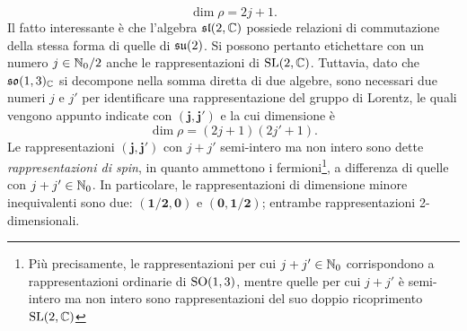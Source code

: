 \begin{equation}
    \dim{\rho} = 2j + 1.
\end{equation}
Il fatto interessante è che l'algebra $\mathfrak{sl}(2,\mathbb{C})$ possiede relazioni di commutazione della stessa forma di quelle di $\mathfrak{su}(2)$. Si possono pertanto etichettare con un numero $j \in \mathbb{N}_0/2$ anche le rappresentazioni di $\mathrm{SL}(2,\mathbb{C})$. Tuttavia, dato che $\mathfrak{so}(1,3)_{\mathbb{C}}$ si decompone nella somma diretta di due algebre, sono necessari due numeri $j$ e $j'$ per identificare una rappresentazione del gruppo di Lorentz, le quali vengono appunto indicate con $\bm{(j,j')}$ e la cui dimensione è
\begin{equation}
    \dim{\rho} = (2j + 1)(2j' + 1).
\end{equation}
Le rappresentazioni $\bm{(j,j')}$ con $j + j'$ semi-intero ma non intero sono dette \emph{rappresentazioni di spin}, in quanto ammettono i fermioni\footnote{Più precisamente, le rappresentazioni per cui $j + j'\in \mathbb{N}_0$ corrispondono a rappresentazioni ordinarie di $\mathrm{SO}(1,3)$, mentre quelle per cui $j + j'$ è semi-intero ma non intero sono rappresentazioni del suo doppio ricoprimento $\mathrm{SL}(2,\mathbb{C})$}, a differenza di quelle con $j + j' \in \mathbb{N}_0$. In particolare, le rappresentazioni di dimensione minore inequivalenti sono due: $\bm{(1/2,0)}$ e $\bm{(0,1/2)}$; entrambe rappresentazioni 2-dimensionali. 

